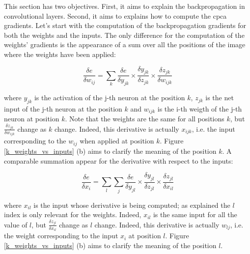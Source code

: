 \documentclass[11pt]{report}
\begin{document}
This section has two objectives. First, it aims to explain the backpropagation in convolutional layers. Second, it aims to explains how to compute the \acrshort{cpca} gradients. Let's start with the computation of the backpropagation gradients for both the weights and the inputs. The only difference for the computation of the weights' gradients is the appearance of a sum over all the positions of the image where the weights have been applied:

\begin{equation} \label{eq:dwc2d}
\frac{\delta e}{\delta w_{ij}} = \sum_{k} \frac{\delta e}{\delta y_{jk}} \times \frac{\delta y_{jk}}{\delta z_{jk}} \times \frac{\delta z_{jk}}{\delta w_{ijk}}
\end{equation}

\noindent where $y_{jk}$ is the activation of the j-th neuron at the position $k$, $z_{jk}$ is the net input of the j-th neuron at the position $k$ and $w_{ijk}$ is the i-th weigth of the j-th neuron at position $k$. Note that the weights are the same for all positions $k$, but $\frac{\delta z_{jk}}{\delta w_{ijk}}$ change as $k$ change. Indeed, this derivative is actually $x_{ijk}$, i.e. the input corresponding to the $w_{ij}$ when applied at position $k$. Figure \ref{k_weights_vs_inputs} (b) aims to clarify the meaning of the position $k$. A comparable summation appear for the derivative with respect to the inputs:

\begin{equation}
\frac{\delta e}{\delta x_{i}} = \sum_{l} \sum_{j} \frac{\delta e}{\delta y_{jl}} \times \frac{\delta y_{jl}}{\delta z_{jl}} \times \frac{\delta z_{jl}}{\delta x_{il}}
\end{equation}

\noindent where $x_{il}$ is the input whose derivative is being computed; as explained the $l$ index is only relevant for the weights. Indeed, $x_{il}$ is the same input for all the value of $l$, but $\frac{\delta z_{jl}}{\delta x_{il}}$ change as $l$ change. Indeed, this derivative is actually $w_{lj}$, i.e. the weight corresponding to the input $x_{i}$ at position $l$. Figure \ref{k_weights_vs_inputs} (b) aims to clarify the meaning of the position $l$.
\end{document}
